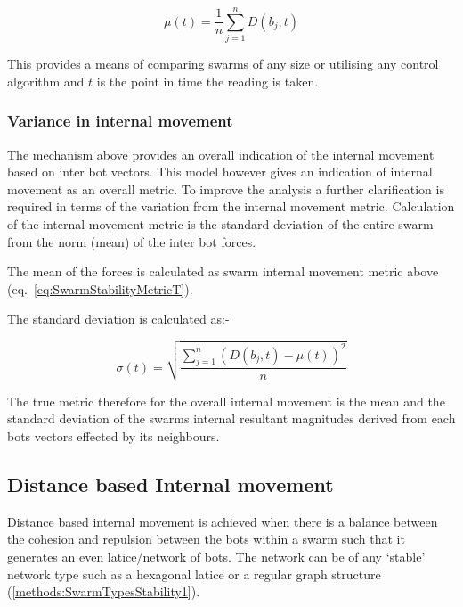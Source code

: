 \documentclass[10pt,journal,letterpaper,twoside]{IEEEtran}
\newcommand{\stability}{internal movement}
\newcommand{\Stability}{Internal movement}
\newcommand{\Eq}{eq.}
\begin{document}


\begin{equation}
\label{eq:SwarmStabilityMetricT}
\mu(t) = \frac{1}{n}{\sum_{j=1}^{n}D(b_j,t)}
\end{equation}

This provides a means of comparing swarms of any size or utilising any control algorithm and $t$ is the point in time the reading is taken.

\subsubsection{Variance in \stability{}}\label{Section:VarienceInStability}

The mechanism above provides an overall indication of the \stability{} based on inter bot vectors. This model however gives an indication of \stability{} as an overall metric. To improve the analysis a further clarification is required in terms of the variation from the \stability{} metric. Calculation of the \stability{} metric is the standard deviation of the entire swarm from the norm (mean) of the inter bot forces.

The mean of the forces is calculated as swarm \stability{} metric above
(\Eq{}~\ref{eq:SwarmStabilityMetricT}).

The standard deviation is calculated as:-

\begin{equation}
\label{eq:SwarmStabilityQuotientT}
\sigma(t) = \sqrt{\frac{\sum_{j=1}^{n}(D(b_j,t)-\mu(t))^2}{n}}
\end{equation}

The true metric therefore for the overall \stability{} is the mean and the standard deviation of the swarms internal resultant magnitudes derived from each bots vectors effected by its neighbours.

\subsection{Distance based \Stability{}}

Distance based \stability{} is achieved when there is a balance between the cohesion and repulsion between the bots within a swarm such that it generates an even latice/network of bots. The network can be of any `stable' network type such as a hexagonal latice or a regular graph structure (\ref{methods:SwarmTypesStability1}).
\end{document}
